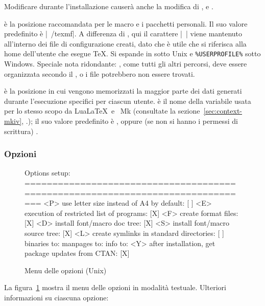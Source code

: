 \documentclass{article}
\begin{document}
Modificare  durante l'installazione causerà anche la
modifica di ,  e
.

 è la posizione raccomandata per le macro e i pacchetti
personali. Il suo valore predefinito è |~/texmf|. A differenza di
, qui il carattere |~| viene mantenuto all'interno dei
file di configurazione creati, dato che è utile che si riferisca alla home
dell'utente che esegue \TeX. Si espande in  sotto
Unix e \verb|%USERPROFILE%| sotto Windows. Speciale nota ridondante:
, come tutti gli altri percorsi, deve essere organizzata
secondo il \TDS, o i file potrebbero non essere trovati. %

 è la posizione in cui vengono memorizzati la maggior
parte dei dati generati durante l'esecuzione specifici per ciascun utente.
 è il nome della variabile usata per lo stesso scopo da
Lua\LaTeX\ e \ConTeXt\ Mk (consultate la
sezione~\ref{sec:context-mkiv}, \p.\pageref{sec:context-mkiv}); il suo
valore predefinito è , oppure (se non si hanno i
permessi di scrittura) .


\subsubsection{Opzioni}
\label{sec:options}

\begin{figure}[tbh]
\begin{boxedverbatim}
Options setup:
===============================================================================
 <P> use letter size instead of A4 by default: [ ]
 <E> execution of restricted list of programs: [X]
 <F> create format files:                      [X]
 <D> install font/macro doc tree:              [X]
 <S> install font/macro source tree:           [X]
 <L> create symlinks in standard directories:  [ ]
            binaries to:
            manpages to:
                info to:
 <Y> after installation, get package updates from CTAN: [X]
\end{boxedverbatim}
\caption{Menu delle opzioni (Unix)}\label{fig:options-text}
\end{figure}

La figura~\ref{fig:options-text} mostra il menu delle opzioni in modalità
testuale. Ulteriori informazioni su ciascuna opzione:
\end{document}
